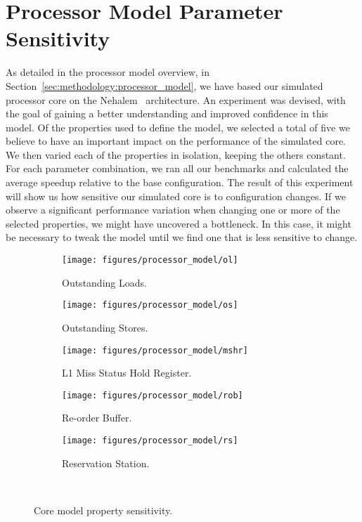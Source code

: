 
\section{Processor Model Parameter Sensitivity}
\label{sec:results:model_sensitivity}

As detailed in the processor model overview, in Section~\ref{sec:methodology:processor_model}, we have based our simulated processor core on the Nehalem~\cite{Thomadakis2011} architecture.
An experiment was devised, with the goal of gaining a better understanding and improved confidence in this model.
Of the properties used to define the model, we selected a total of five we believe to have an important impact on the performance of the simulated core.
We then varied each of the properties in isolation, keeping the others constant.
For each parameter combination, we ran all our benchmarks and calculated the average speedup relative to the base configuration.
The result of this experiment will show us how sensitive our simulated core is to configuration changes.
If we observe a significant performance variation when changing one or more of the selected properties, we might have uncovered a bottleneck.
In this case, it might be necessary to tweak the model until we find one that is less sensitive to change.

\begin{figure}[H]
        \centering
        \begin{subfigure}[b]{0.5\textwidth}
                \texttt{[image: figures/processor\_model/ol]}
                \caption{Outstanding Loads.}
                \label{fig:results:processor_model:ol}
        \end{subfigure}%
        \begin{subfigure}[b]{0.5\textwidth}
                \texttt{[image: figures/processor\_model/os]}
                \caption{Outstanding Stores.}
                \label{fig:results:processor_model:os}
        \end{subfigure}
        \begin{subfigure}[b]{0.5\textwidth}
                \texttt{[image: figures/processor\_model/mshr]}
                \caption{L1 Miss Status Hold Register.}
                \label{fig:results:processor_model:mshr}
        \end{subfigure}%
        \begin{subfigure}[b]{0.5\textwidth}
                \texttt{[image: figures/processor\_model/rob]}
                \caption{Re-order Buffer.}
                \label{fig:results:processor_model:rob}
        \end{subfigure}
        \begin{subfigure}[b]{0.5\textwidth}
                \texttt{[image: figures/processor\_model/rs]}
                \caption{Reservation Station.}
                \label{fig:results:processor_model:rs}
        \end{subfigure}%
        \caption{Core model property sensitivity.}
        \label{fig:results:processor_model}
       ~ %
\end{figure}

